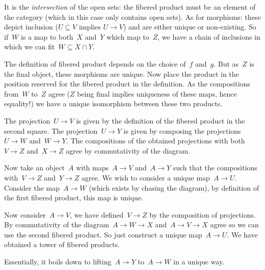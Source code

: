 \begin{exercise}
  It is the \emph{intersection} of the open sets: the fibered product must be an element of the category (which in this case only contains open sets). As for morphisms: these depict inclusion ($U\subseteq V$ implies $U\to V$) and are either unique or non-existing. So if~$W$ is a map to both~$X$ and~$Y$ which map to~$Z$, we have a chain of inclusions in which we can fit~$W\subseteq X\cap Y$.
\end{exercise}

\begin{exercise}
  The definition of fibered product depends on the choice of~$f$ and~$g$. But as~$Z$ is the final object, these morphisms are unique. Now place the product in the position reserved for the fibered product in the definition. As the compositions from~$W$ to~$Z$ agree ($Z$ being final implies uniqueness of these maps, hence equality!) we have a unique isomorphism between these two products.
\end{exercise}

\begin{exercise}
  The projection~$U\to V$ is given by the definition of the fibered product in the second square. The projection~$U\to Y$ is given by composing the projections~$U\to W$ and~$W\to Y$. The compositions of the obtained projections with both~$V\to Z$ and~$X\to Z$ agree by commutativity of the diagram.

  Now take an object~$A$ with maps~$A\to V$ and~$A\to Y$ such that the compositions with~$V\to Z$ and~$Y\to Z$ agree. We wish to consider a unique map~$A\to U$. Consider the map~$A\to W$ (which exists by chasing the diagram), by definition of the first fibered product, this map is unique.
  
  Now consider~$A\to V$, we have defined~$V\to Z$ by the composition of projections. By commutativity of the diagram~$A\to W\to X$ and~$A\to V\to X$ agree so we can use the second fibered product. So just construct a unique map~$A\to U$. We have obtained a tower of fibered products.

  Essentially, it boils down to lifting~$A\to Y$ to~$A\to W$ in a unique way.
\end{exercise}

